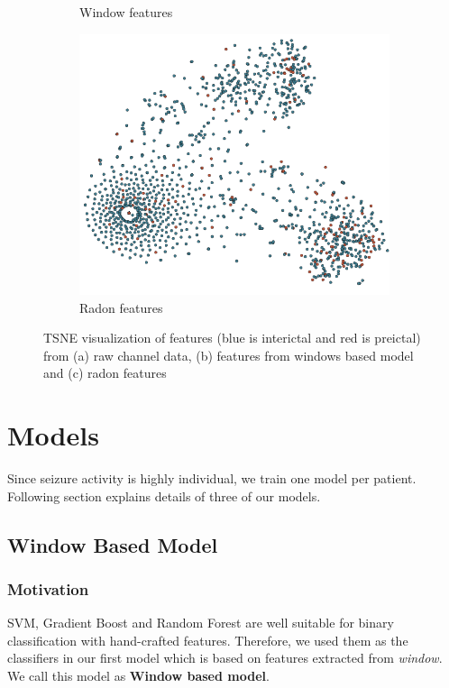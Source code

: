 \documentclass[letterpaper,12pt]{article}
\begin{document}
\begin{figure}[]
\begin{subfigure}[t]{2in}
		\caption{Window features}\label{fig:1b}
	\end{subfigure}
  \begin{subfigure}[t]{2in} \centering
    \includegraphics[scale=0.2]{images/tsne_Radon.png}
		\caption{Radon features}\label{fig:1b}
	\end{subfigure}
	\caption{TSNE visualization of features (blue is interictal and red is
    preictal) from (a) raw channel data, (b) features from windows based model and
    (c) radon features}\label{fig:1}
  \label{fig:tsne}
\end{figure}

\section{Models}
Since seizure activity is highly individual, we train one model per patient.
Following section explains details of three of our models.

\subsection{Window Based Model}

\subsubsection{Motivation} 
SVM, Gradient Boost and Random Forest are well suitable for binary
classification with hand-crafted features. Therefore, we used them as
the classifiers in our first model which is based on features extracted from
\textit{window}. We call this model as \textbf{Window based model}.
\end{document}
